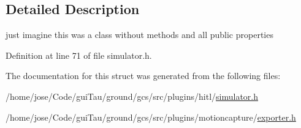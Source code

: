 \subsection{Detailed Description}
just imagine this was a class without methods and all public properties 

Definition at line 71 of file simulator.\-h.



The documentation for this struct was generated from the following files\-:\begin{DoxyCompactItemize}
\item 
/home/jose/\-Code/gui\-Tau/ground/gcs/src/plugins/hitl/\hyperlink{simulator_8h}{simulator.\-h}\item 
/home/jose/\-Code/gui\-Tau/ground/gcs/src/plugins/motioncapture/\hyperlink{exporter_8h}{exporter.\-h}\end{DoxyCompactItemize}
